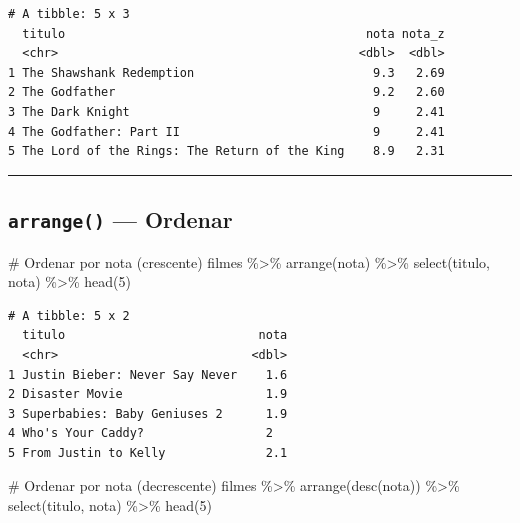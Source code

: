 \documentclass[
  letterpaper,
]{scrbook}
\newenvironment{Shaded}{\begin{snugshade}}{\end{snugshade}}
\newcommand{\CommentTok}[1]{\textcolor[rgb]{0.37,0.37,0.37}{#1}}
\newcommand{\DecValTok}[1]{\textcolor[rgb]{0.68,0.00,0.00}{#1}}
\newcommand{\FunctionTok}[1]{\textcolor[rgb]{0.28,0.35,0.67}{#1}}
\newcommand{\NormalTok}[1]{\textcolor[rgb]{0.00,0.23,0.31}{#1}}
\newcommand{\SpecialCharTok}[1]{\textcolor[rgb]{0.37,0.37,0.37}{#1}}
\begin{document}
\begin{verbatim}
# A tibble: 5 x 3
  titulo                                          nota nota_z
  <chr>                                          <dbl>  <dbl>
1 The Shawshank Redemption                         9.3   2.69
2 The Godfather                                    9.2   2.60
3 The Dark Knight                                  9     2.41
4 The Godfather: Part II                           9     2.41
5 The Lord of the Rings: The Return of the King    8.9   2.31
\end{verbatim}

\begin{center}\rule{0.5\linewidth}{0.5pt}\end{center}

\subsection{\texorpdfstring{\texttt{arrange()} ---
Ordenar}{arrange() --- Ordenar}}\label{arrange-ordenar}

\begin{Shaded}
\begin{Highlighting}[]
\CommentTok{\# Ordenar por nota (crescente)}
\NormalTok{filmes }\SpecialCharTok{\%\textgreater{}\%} 
  \FunctionTok{arrange}\NormalTok{(nota) }\SpecialCharTok{\%\textgreater{}\%} 
  \FunctionTok{select}\NormalTok{(titulo, nota) }\SpecialCharTok{\%\textgreater{}\%} 
  \FunctionTok{head}\NormalTok{(}\DecValTok{5}\NormalTok{)}
\end{Highlighting}
\end{Shaded}

\begin{verbatim}
# A tibble: 5 x 2
  titulo                           nota
  <chr>                           <dbl>
1 Justin Bieber: Never Say Never    1.6
2 Disaster Movie                    1.9
3 Superbabies: Baby Geniuses 2      1.9
4 Who's Your Caddy?                 2  
5 From Justin to Kelly              2.1
\end{verbatim}

\begin{Shaded}
\begin{Highlighting}[]
\CommentTok{\# Ordenar por nota (decrescente)}
\NormalTok{filmes }\SpecialCharTok{\%\textgreater{}\%} 
  \FunctionTok{arrange}\NormalTok{(}\FunctionTok{desc}\NormalTok{(nota)) }\SpecialCharTok{\%\textgreater{}\%} 
  \FunctionTok{select}\NormalTok{(titulo, nota) }\SpecialCharTok{\%\textgreater{}\%} 
  \FunctionTok{head}\NormalTok{(}\DecValTok{5}\NormalTok{)}
\end{Highlighting}
\end{Shaded}
\end{document}
